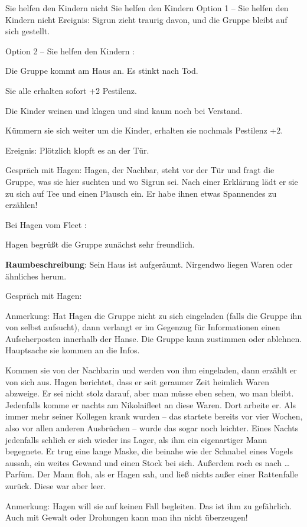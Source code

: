 Sie helfen den Kindern nicht
Sie helfen den Kindern
Option 1 – Sie helfen den Kindern nicht
Ereignis: Sigrun zieht traurig davon, und die Gruppe bleibt auf sich gestellt.


Option 2 – Sie helfen den Kindern
:

Die Gruppe kommt am Haus an. Es stinkt nach Tod.

Sie alle erhalten sofort +2 Pestilenz.

Die Kinder weinen und klagen und sind kaum noch bei Verstand.

Kümmern sie sich weiter um die Kinder, erhalten sie nochmals Pestilenz +2.

Ereignis: Plötzlich klopft es an der Tür.

Gespräch mit Hagen: Hagen, der Nachbar, steht vor der Tür und fragt die Gruppe, was sie hier suchten und wo Sigrun sei. Nach einer Erklärung lädt er sie zu sich auf Tee und einen Plausch ein. Er habe ihnen etwas Spannendes zu erzählen!

Bei Hagen vom Fleet
:

Hagen begrüßt die Gruppe zunächst sehr freundlich.

\textbf{Raumbeschreibung}: Sein Haus ist aufgeräumt. Nirgendwo liegen Waren oder ähnliches herum.

Gespräch mit Hagen:

Anmerkung: Hat Hagen die Gruppe nicht zu sich eingeladen (falls die Gruppe ihn von selbst aufsucht), dann verlangt er im Gegenzug für Informationen einen Aufseherposten innerhalb der Hanse. Die Gruppe kann zustimmen oder ablehnen. Hauptsache sie kommen an die Infos.

Kommen sie von der Nachbarin und werden von ihm eingeladen, dann erzählt er von sich aus.
Hagen berichtet, dass er seit geraumer Zeit heimlich Waren abzweige. Er sei nicht stolz darauf, aber man müsse eben sehen, wo man bleibt. Jedenfalls komme er nachts am Nikolaifleet an diese Waren. Dort arbeite er. Als immer mehr seiner Kollegen krank wurden – das startete bereits vor vier Wochen, also vor allen anderen Ausbrüchen – wurde das sogar noch leichter. Eines Nachts jedenfalls schlich er sich wieder ins Lager, als ihm ein eigenartiger Mann begegnete. Er trug eine lange Maske, die beinahe wie der Schnabel eines Vogels aussah, ein weites Gewand und einen Stock bei sich. Außerdem roch es nach … Parfüm. Der Mann floh, als er Hagen sah, und ließ nichts außer einer Rattenfalle zurück. Diese war aber leer.

Anmerkung: Hagen will sie auf keinen Fall begleiten. Das ist ihm zu gefährlich. Auch mit Gewalt oder Drohungen kann man ihn nicht überzeugen!

